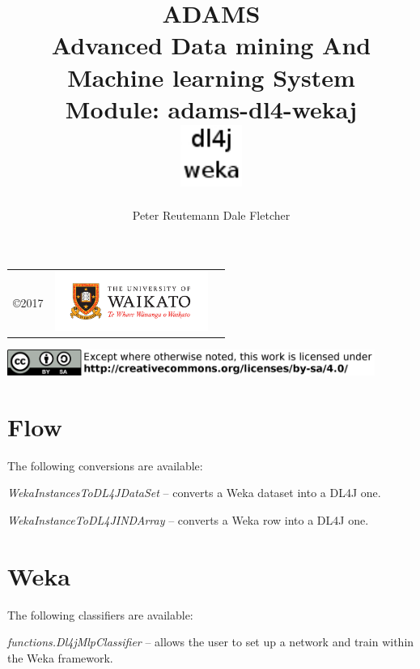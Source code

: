 \documentclass[a4paper]{book}
\title{
  \textbf{ADAMS} \\
  {\Large \textbf{A}dvanced \textbf{D}ata mining \textbf{A}nd \textbf{M}achine
  learning \textbf{S}ystem} \\
  {\Large Module: adams-dl4-wekaj} \\
  \vspace{1cm}
  \includegraphics[width=2cm]{images/dl4j-weka-module.png} \\
}
\author{
  Peter Reutemann
  Dale Fletcher
}
\begin{document}
\begin{titlepage}
\maketitle

\thispagestyle{empty}
\center
\begin{table}[b]
	\begin{tabular}{c l l}
		\parbox[c][2cm]{2cm}{\copyright 2017} &
		\parbox[c][2cm]{5cm}{\includegraphics[width=5cm]{images/coat_of_arms.pdf}} \\
	\end{tabular}
	\includegraphics[width=12cm]{images/cc.png} \\
\end{table}

\end{titlepage}

\tableofcontents

\chapter{Flow}
The following conversions are available:
\begin{tight_itemize}
  \item \textit{WekaInstancesToDL4JDataSet} -- converts a Weka dataset into
  a DL4J one.
  \item \textit{WekaInstanceToDL4JINDArray} -- converts a Weka row into a
  DL4J one.
\end{tight_itemize}

\chapter{Weka}
The following classifiers are available:
\begin{tight_itemize}
  \item \textit{functions.Dl4jMlpClassifier} -- allows the user to set up a network
  and train within the Weka framework.
\end{tight_itemize}


\end{document}
